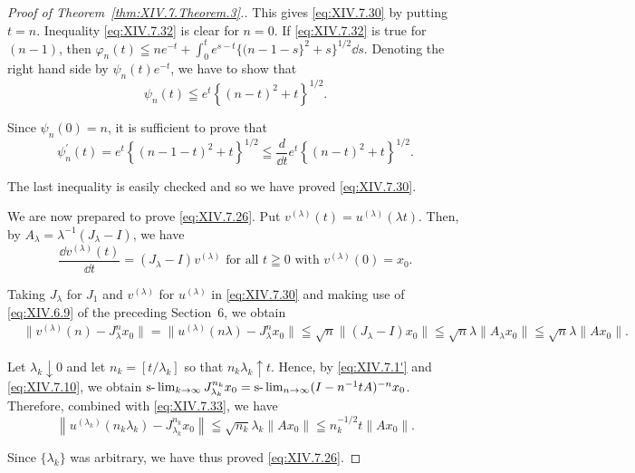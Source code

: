\begin{proof}[Proof of Theorem~\ref{thm:XIV.7.Theorem.3}.]
This gives \eqref{eq:XIV.7.30} by putting $t = n$. Inequality \eqref{eq:XIV.7.32} is clear for $n = 0$. If \eqref{eq:XIV.7.32} 
is true for $(n - 1)$, then $\varphi_n(t) \leqq n e^{-t} + \int_0^t e^{s-t}\{ (n - 1 - s\}^2 + s\}^{1/2} \dd s$. Denoting 
the right hand side by $\psi_{n}(t)e^{-t}$, we have to show that 
\[
\psi_{n} (t) \leqq e ^{t} \left\{(n - t) ^{2} + t \right\} ^{1/2}.
\]

Since $\psi_{n}(0) = n$, it is sufficient to prove that 
\[
\psi_{n} ^{\prime} (t) = e ^{t} \left\{(n - 1 - t) ^{2} + t \right\} ^{1/2} \leqq \frac {d}{\dd t} e ^{t} \left\{(n - t) ^{2} + t \right\} ^{1/2}.
\]

The last inequality is easily checked and so we have proved \eqref{eq:XIV.7.30}. 

We are now prepared to prove \eqref{eq:XIV.7.26}. Put $v^{(\lambda)}(t) = u^{(\lambda)}(\lambda t)$. Then, by $A_{\lambda} = \lambda^{-1}(J_{\lambda} - I)$, we have 
\begin{equation}\tag{25'}\label{eq:XIV.7.25'}
\frac {\dd v ^{(\lambda)} (t)}{\dd t} = \left(J _{\lambda} - I\right) v ^{(\lambda)} \text{ for all } t \geqq 0 \text{ with } v ^{(\lambda)} (0) = x _{0}.
\end{equation}

Taking $J_{\lambda}$ for $J_{1}$ and $v^{(\lambda)}$ for $u^{(\lambda)}$ in \eqref{eq:XIV.7.30} and making use of \eqref{eq:XIV.6.9} of the preceding Section~\hyperref[sec:XIV.6]{$6$}, we obtain 
\begin{equation}\label{eq:XIV.7.33}
\begin{aligned}
&\| v ^{(\lambda)} (n) - J _{\lambda} ^{n} x _{0} \|  = \| u ^{(\lambda)} (n \lambda) - J _{\lambda} ^{n} x _{0} \| \leqq \sqrt {n} \| (J _{\lambda} - I) x _{0} \| \leqq \sqrt {n} \lambda \| A _{\lambda} x _{0} \| \leqq \sqrt {n} \lambda \| A x _{0} \|.
\end{aligned}
\end{equation}

Let $\lambda_{k} \downarrow 0$ and let $n_{k} = [t / \lambda_{k}]$ so that $n_{k} \lambda_{k} \uparrow t$. Hence, by \eqref{eq:XIV.7.1'} and \eqref{eq:XIV.7.10}, we obtain $\text{s-}\lim\nolimits_{k \to \infty} J_{\lambda_k}^{n_k} x_0 = \text{s-}\lim\nolimits_{n \to \infty} (I - n^{-1} tA)^{-n} x_0$. Therefore, combined with \eqref{eq:XIV.7.33}, we have 
\[
\left\| u ^ {\left(\lambda_{k}\right)} \left(n _{k} \lambda_{k}\right) - J _ {\lambda_{k}} ^ {n _{k}} x _{0} \right\| \leqq \sqrt {n _{k}} \lambda_{k} \left\| A x _{0} \right\| \leqq n _{k} ^{-1/2} t \left\| A x _{0} \right\|.
\]

Since $\{\lambda_k\}$ was arbitrary, we have thus proved \eqref{eq:XIV.7.26}. 
\end{proof}

